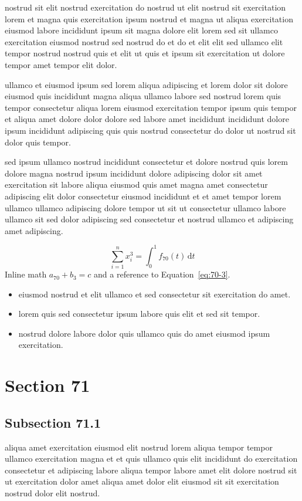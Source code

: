\documentclass{article}
\begin{document}
nostrud sit elit nostrud exercitation do nostrud ut elit nostrud sit exercitation lorem et magna quis exercitation ipsum nostrud et magna ut aliqua exercitation eiusmod labore incididunt ipsum sit magna dolore elit lorem sed sit ullamco exercitation eiusmod nostrud sed nostrud do et do et elit elit sed ullamco elit tempor nostrud nostrud quis et elit ut quis et ipsum sit exercitation ut dolore tempor amet tempor elit dolor.

ullamco et eiusmod ipsum sed lorem aliqua adipiscing et lorem dolor sit dolore eiusmod quis incididunt magna aliqua ullamco labore sed nostrud lorem quis tempor consectetur aliqua lorem eiusmod exercitation tempor ipsum quis tempor et aliqua amet dolore dolor dolore sed labore amet incididunt incididunt dolore ipsum incididunt adipiscing quis quis nostrud consectetur do dolor ut nostrud sit dolor quis tempor.

sed ipsum ullamco nostrud incididunt consectetur et dolore nostrud quis lorem dolore magna nostrud ipsum incididunt dolore adipiscing dolor sit amet exercitation sit labore aliqua eiusmod quis amet magna amet consectetur adipiscing elit dolor consectetur eiusmod incididunt et et amet tempor lorem ullamco ullamco adipiscing dolore tempor ut sit ut consectetur ullamco labore ullamco sit sed dolor adipiscing sed consectetur et nostrud ullamco et adipiscing amet adipiscing.

\begin{equation}\label{eq:70-3}
  \sum_{i=1}^{n} x_i^{3} = \int_0^1 f_{70}(t)\,\mathrm{d}t
\end{equation}
Inline math $a_{70} + b_{3} = c$ and a reference to Equation~\eqref{eq:70-3}.

\begin{itemize}
  \item eiusmod nostrud et elit ullamco et sed consectetur sit exercitation do amet.
  \item lorem quis sed consectetur ipsum labore quis elit et sed sit tempor.
  \item nostrud dolore labore dolor quis ullamco quis do amet eiusmod ipsum exercitation.
\end{itemize}

\section{Section 71}\label{sec:71}
\subsection{Subsection 71.1}\label{sec:71-1}
aliqua amet exercitation eiusmod elit nostrud lorem aliqua tempor tempor ullamco exercitation magna et et quis ullamco quis elit incididunt do exercitation consectetur et adipiscing labore aliqua tempor labore amet elit dolore nostrud sit ut exercitation dolor amet aliqua amet dolor elit eiusmod sit sit exercitation nostrud dolor elit nostrud.
\end{document}
